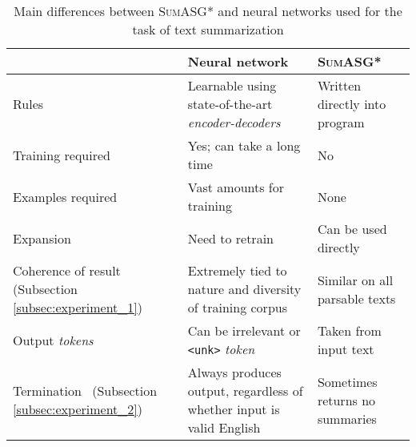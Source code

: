 \begin{table}[H]
\centering
\begin{tabular}{@{}L{0.25\textwidth}L{0.4\textwidth}L{0.35\textwidth}@{}}
\toprule
                                        & Neural network                                                                                              & \textsc{SumASG*}                        \\ \midrule
Rules                                   & Learnable using state-of-the-art \textit{encoder-decoders}                                 & Written directly into program  \\
Training required                       & Yes; can take a long time                                                                                   & No                             \\
Examples required                       & Vast amounts for training                                                                                   & None                           \\
Expansion                               & Need to retrain                                                                                             & Can be used directly           \\
Coherence of result (Subsection \ref{subsec:experiment_1})                     & Extremely tied to nature and diversity of training corpus                                                   & Similar on all parsable texts  \\
Output \textit{tokens} & Can be irrelevant or \texttt{<unk>} \textit{token} & Taken from input text   \\
Termination\mbox{    } (Subsection \ref{subsec:experiment_2})                             & Always produces output, regardless of whether input is valid English                                        & Sometimes returns no summaries \\ \bottomrule
\end{tabular}
\caption{Main differences between \textsc{SumASG*} and neural networks used for the task of text summarization}
\label{table:takeaways}
\end{table}
